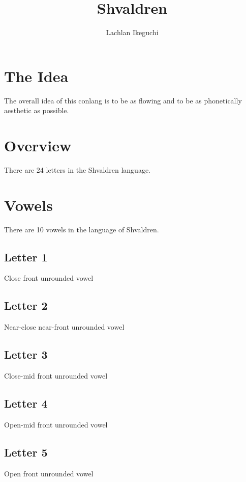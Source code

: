 \documentclass{article}
\title{Shvaldren}
\author{Lachlan Ikeguchi}
\newcommand{\letter}[1]{\begin{center}\resizebox{1cm}{!}{\texttt{[image: \#1]}}\end{center}}
\begin{document}
\maketitle
\tableofcontents


\section{The Idea}
The overall idea of this conlang is to be as flowing and to be as phonetically aesthetic as possible.


\section{Overview}
There are 24 letters in the Shvaldren language.


\section{Vowels}
There are 10 vowels in the language of Shvaldren.

\subsection{Letter 1}
Close front unrounded vowel

\letter{letters/vowels/1.JPG}


\subsection{Letter 2}
Near-close near-front unrounded vowel

\letter{letters/vowels/2.JPG}

\subsection{Letter 3}
Close-mid front unrounded vowel

\letter{letters/vowels/3.JPG}

\subsection{Letter 4}
Open-mid front unrounded vowel

\letter{letters/vowels/4.JPG}

\subsection{Letter 5}
Open front unrounded vowel
\end{document}
